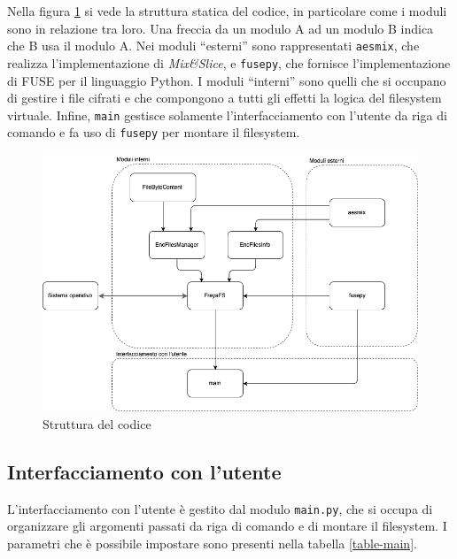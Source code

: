 \documentclass[a4paper,12pt,twoside,openright]{report}
\begin{document}
  Nella figura \ref{struttura-statica} si vede la struttura statica del codice, in particolare come i
  moduli sono in relazione tra loro. Una freccia da un modulo A ad un modulo B indica che B usa il modulo A.
  Nei moduli ``esterni'' sono rappresentati \texttt{aesmix}, che realizza l'implementazione di \textit{Mix\&Slice},
  e \texttt{fusepy}, che fornisce l'implementazione di FUSE per il linguaggio Python.
  I moduli ``interni'' sono quelli che si occupano di gestire i file cifrati e che compongono a tutti
  gli effetti la logica del filesystem virtuale.
  Infine, \texttt{main} gestisce solamente l'interfacciamento con l'utente da riga di comando
  e fa uso di \texttt{fusepy} per montare il filesystem.

  \begin{figure}
    \centering
    \includegraphics[width=0.8\linewidth]{images/code-diagram.png}
    \caption{Struttura del codice}
    \label{struttura-statica}
  \end{figure}

  \subsection{Interfacciamento con l'utente}

  L'interfacciamento con l'utente è gestito dal modulo \texttt{main.py}, che si occupa di organizzare
  gli argomenti passati da riga di comando e di montare il filesystem.
  I parametri che è possibile impostare sono presenti nella tabella \ref{table-main}.
\end{document}

